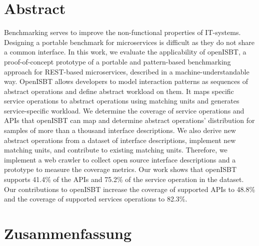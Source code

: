 
\cleardoublepage
{}
\section*{Abstract}

Benchmarking serves to improve the non-functional properties of IT-systems. Designing a portable benchmark for microservices is difficult as they do not share a common interface. 
In this work, we evaluate the applicability of openISBT, a proof-of-concept prototype of a portable and pattern-based benchmarking approach for REST-based microservices, described in a machine-understandable way. OpenISBT allows developers to model interaction patterns as sequences of abstract operations and define abstract workload on them. It maps specific service operations to abstract operations using matching units and generates service-specific workload. We determine the coverage of service operations and APIs that openISBT can map and determine abstract operations' distribution for samples of more than a thousand interface descriptions. We also derive new abstract operations from a dataset of interface descriptions, implement new matching units, and contribute to existing matching units. Therefore, we implement a web crawler to collect open source interface descriptions and a prototype to measure the coverage metrics.
Our work shows that openISBT supports  41.4\% of the APIs and 75.2\% of the service operation in the dataset. Our contributions to openISBT increase the coverage of supported APIs to 48.8\% and the coverage of supported services operations to 82.3\%. 

\newpage
{}
\section*{Zusammenfassung}

